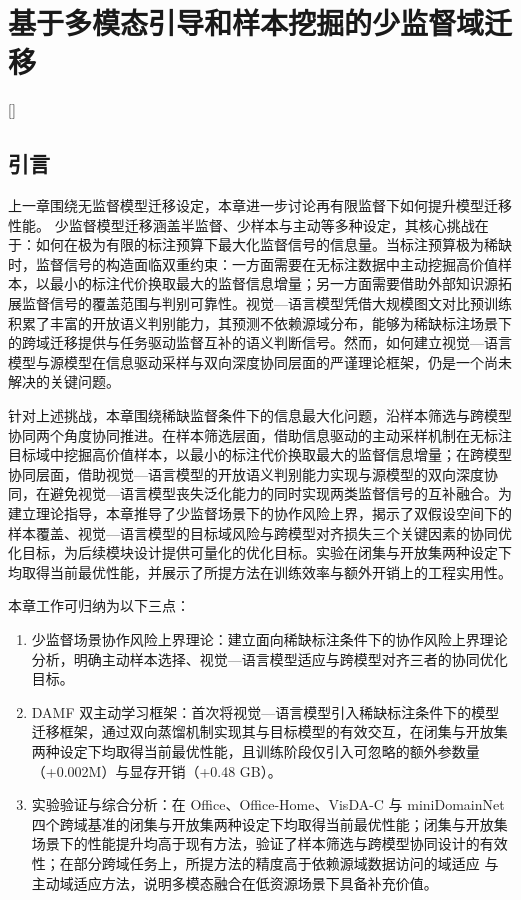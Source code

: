 
\chapter[基于多模态引导和样本挖掘的少监督域迁移]{基于多模态引导和样本挖掘的少监督域迁移}[]

\section{引言}

上一章围绕无监督模型迁移设定，本章进一步讨论再有限监督下如何提升模型迁移性能。
少监督模型迁移涵盖半监督、少样本与主动等多种设定，其核心挑战在于：如何在极为有限的标注预算下最大化监督信号的信息量。当标注预算极为稀缺时，监督信号的构造面临双重约束：一方面需要在无标注数据中主动挖掘高价值样本，以最小的标注代价换取最大的监督信息增量；另一方面需要借助外部知识源拓展监督信号的覆盖范围与判别可靠性。视觉—语言模型凭借大规模图文对比预训练积累了丰富的开放语义判别能力，其预测不依赖源域分布，能够为稀缺标注场景下的跨域迁移提供与任务驱动监督互补的语义判断信号。然而，如何建立视觉—语言模型与源模型在信息驱动采样与双向深度协同层面的严谨理论框架，仍是一个尚未解决的关键问题。

针对上述挑战，本章围绕稀缺监督条件下的信息最大化问题，沿样本筛选与跨模型协同两个角度协同推进。在样本筛选层面，借助信息驱动的主动采样机制在无标注目标域中挖掘高价值样本，以最小的标注代价换取最大的监督信息增量；在跨模型协同层面，借助视觉—语言模型的开放语义判别能力实现与源模型的双向深度协同，在避免视觉—语言模型丧失泛化能力的同时实现两类监督信号的互补融合。为建立理论指导，本章推导了少监督场景下的协作风险上界，揭示了双假设空间下的样本覆盖、视觉—语言模型的目标域风险与跨模型对齐损失三个关键因素的协同优化目标，为后续模块设计提供可量化的优化目标。实验在闭集与开放集两种设定下均取得当前最优性能，并展示了所提方法在训练效率与额外开销上的工程实用性。

本章工作可归纳为以下三点：
\begin{enumerate}
    \item 少监督场景协作风险上界理论：建立面向稀缺标注条件下的协作风险上界理论分析，明确主动样本选择、视觉—语言模型适应与跨模型对齐三者的协同优化目标。
    \item DAMF 双主动学习框架：首次将视觉—语言模型引入稀缺标注条件下的模型迁移框架，通过双向蒸馏机制实现其与目标模型的有效交互，在闭集与开放集两种设定下均取得当前最优性能，且训练阶段仅引入可忽略的额外参数量（+0.002M）与显存开销（+0.48 GB）。
    \item 实验验证与综合分析：在 Office、Office-Home、VisDA-C 与 miniDomainNet 四个跨域基准的闭集与开放集两种设定下均取得当前最优性能；闭集与开放集场景下的性能提升均高于现有方法，验证了样本筛选与跨模型协同设计的有效性；在部分跨域任务上，所提方法的精度高于依赖源域数据访问的域适应 与主动域适应方法，说明多模态融合在低资源场景下具备补充价值。
\end{enumerate}

